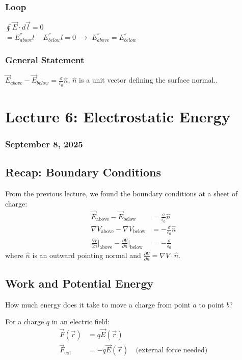 \documentclass{article}
\begin{document}
\subsubsection{Loop}
$\oint \vec{E} \cdot d\vec{l} = 0$ \\
$=E^{''}_{above}l-E^{''}_{below}l=0$ $\rightarrow$ $E^{''}_{above}=E^{''}_{below}$
\subsubsection{General Statement}
$\vec{E}_{above}-\vec{E}_{below}=\frac{\sigma}{\epsilon_0}\hat{n}$, $\hat{n}$ is a unit vector defining the surface normal..


\newpage
\section{Lecture 6: Electrostatic Energy}
\subsubsection*{September 8, 2025}

\subsection{Recap: Boundary Conditions}
From the previous lecture, we found the boundary conditions at a sheet of charge:
\begin{align}
    \vec{E}_{\text{above}} - \vec{E}_{\text{below}} &= \frac{\sigma}{\epsilon_0}\hat{n} \\
    \nabla V_{\text{above}} - \nabla V_{\text{below}} &= -\frac{\sigma}{\epsilon_0}\hat{n} \\
    \frac{\partial V}{\partial n}\bigg|_{\text{above}} - \frac{\partial V}{\partial n}\bigg|_{\text{below}} &= -\frac{\sigma}{\epsilon_0}
\end{align}
where $\hat{n}$ is an outward pointing normal and $\frac{\partial V}{\partial n} = \nabla V \cdot \hat{n}$.

\subsection{Work and Potential Energy}
How much energy does it take to move a charge from point $a$ to point $b$?

For a charge $q$ in an electric field:
\begin{align}
    \vec{F}(\vec{r}) &= q\vec{E}(\vec{r}) \\
    \vec{F}_{\text{ext}} &= -q\vec{E}(\vec{r}) \quad \text{(external force needed)}
\end{align}
\end{document}
